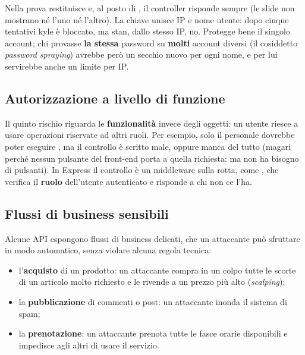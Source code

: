 Nella prova  restituisce  e, al
posto di , il controller risponde sempre 
(le slide non mostrano né l'uno né l'altro). La chiave unisce IP e nome utente:
dopo cinque tentativi kyle è bloccato, ma stan, dallo stesso IP, no. Protegge
bene il singolo account; chi provasse \textbf{la stessa} password su
\textbf{molti} account diversi (il cosiddetto \textit{password spraying})
avrebbe però un secchio nuovo per ogni nome, e per lui servirebbe anche un
limite per IP.

\subsection{Autorizzazione a livello di funzione}

Il quinto rischio riguarda le \textbf{funzionalità} invece degli oggetti: un
utente riesce a usare operazioni riservate ad altri ruoli. Per esempio, solo il
personale dovrebbe poter eseguire , ma il
controllo è scritto male, oppure manca del tutto (magari perché nessun pulsante
del front-end porta a quella richiesta: ma  non ha bisogno di
pulsanti). In Express il controllo è un middleware sulla rotta, come
, che verifica il \textbf{ruolo} dell'utente
autenticato e risponde  a chi non ce l'ha.

\subsection{Flussi di business sensibili}

Alcune API espongono flussi di business delicati, che un attaccante può
sfruttare in modo automatico, senza violare alcuna regola tecnica:

\begin{itemize}
  \item l'\textbf{acquisto} di un prodotto: un attaccante compra in un colpo
        tutte le scorte di un articolo molto richiesto e le rivende a un prezzo
        più alto (\textit{scalping});
  \item la \textbf{pubblicazione} di commenti o post: un attaccante inonda il
        sistema di spam;
  \item la \textbf{prenotazione}: un attaccante prenota tutte le fasce orarie
        disponibili e impedisce agli altri di usare il servizio.
\end{itemize}

